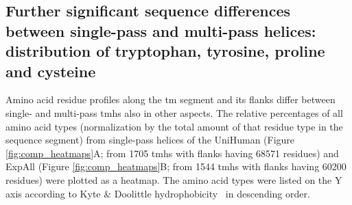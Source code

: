 \subsection{Further significant sequence differences between single-pass and multi-pass helices: distribution of tryptophan, tyrosine, proline and cysteine}

Amino acid residue profiles along the \gls{tm} segment and its flanks differ between single- and multi-pass \gls{tmh}s also in other aspects. The relative percentages of all amino acid types (normalization by the total amount of that residue type in the sequence segment) from single-pass helices of the UniHuman (Figure \ref{fig:comp_heatmaps}A; from 1705 \gls{tmh}s with flanks having 68571 residues) and ExpAll (Figure \ref{fig:comp_heatmaps}B; from 1544 \gls{tmh}s with flanks having 60200 residues) were plotted as a heatmap. The amino acid types were listed on the Y axis according to Kyte \& Doolittle hydrophobicity~\cite{Kyte1982} in descending order.

